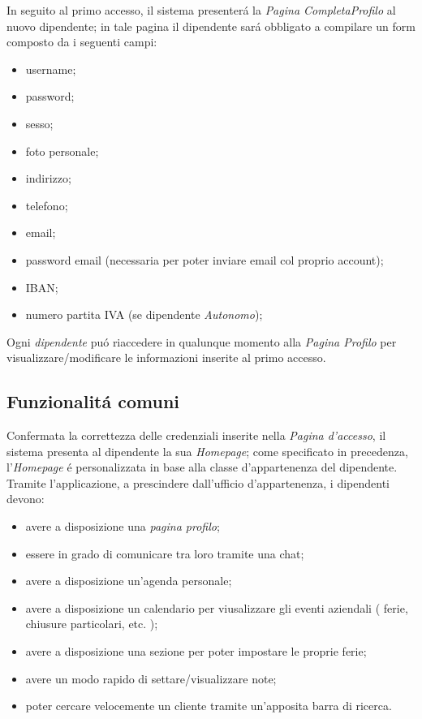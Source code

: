 \documentclass[paper=a4, fontsize=11pt]{scrartcl} %
\numberwithin{equation}{section} %
\numberwithin{figure}{section} %
\numberwithin{table}{section} %
\begin{document}
In seguito al primo accesso, il sistema presenter\'a la \textit{Pagina CompletaProfilo} al nuovo dipendente; in tale pagina il dipendente
sar\'a obbligato a compilare un form composto da i seguenti campi:
\begin{itemize}
	\item username;
	\item password;
    \item sesso;
	\item foto personale;
	\item indirizzo;
	\item telefono;
	\item email;
    \item password email (necessaria per poter inviare email col proprio account);
	\item IBAN;
	\item numero partita IVA (se dipendente \textit{Autonomo});
\end{itemize}

Ogni \textit{dipendente} pu\'o riaccedere in qualunque momento alla \textit{Pagina Profilo}
per visualizzare/modificare le informazioni inserite al primo accesso.

\subsection{Funzionalit\'a comuni}

Confermata la correttezza delle credenziali inserite
nella \textit{Pagina d'accesso}, il sistema presenta al dipendente la sua \textit{Homepage};
come specificato in precedenza, l'\textit{Homepage} \'e personalizzata in base alla classe d'appartenenza del dipendente.\\
Tramite l'applicazione, a prescindere dall'ufficio d'appartenenza, i dipendenti devono:
\begin{itemize}
\item avere a disposizione una \textit{pagina profilo};
\item essere in grado di comunicare tra loro tramite una chat;
\item avere a disposizione un'agenda personale;
\item avere a disposizione un calendario per viusalizzare gli eventi aziendali ( ferie, chiusure particolari, etc. );
\item avere a disposizione una sezione per poter impostare le proprie ferie;
\item avere un modo rapido di settare/visualizzare note;
\item poter cercare velocemente un cliente tramite un'apposita barra di ricerca.
\end{itemize}
\end{document}
